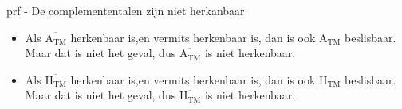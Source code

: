 \begin{prf}{prf - De complemententalen zijn niet herkanbaar}
    \begin{itemize}
        \item 
            Als $\overline{\text{A}_{\text{TM}}}$ herkenbaar is,en vermits herkenbaar is, dan is ook $\text{A}_{\text{TM}}$ beslisbaar. Maar dat is niet het geval, dus $\overline{\text{A}_{\text{TM}}}$ is niet herkenbaar.
        \item 
            Als $\overline{\text{H}_{\text{TM}}}$ herkenbaar is,en vermits herkenbaar is, dan is ook $\text{H}_{\text{TM}}$ beslisbaar. Maar dat is niet het geval, dus $\overline{\text{H}_{\text{TM}}}$ is niet herkenbaar.
    \end{itemize}
\end{prf}